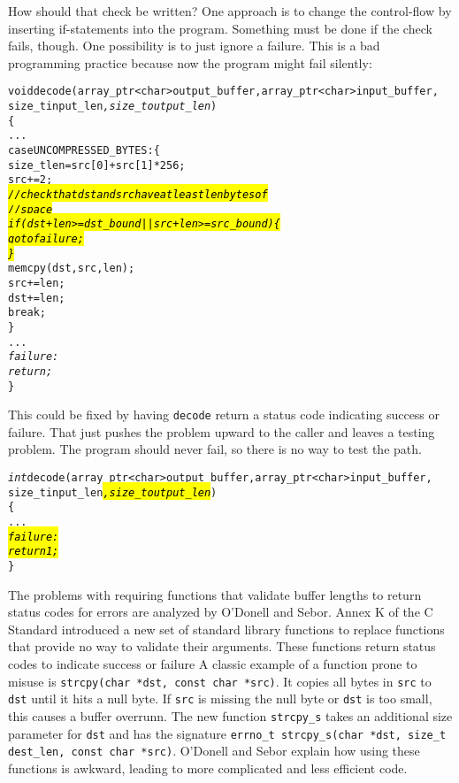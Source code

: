 How should that check be written? One approach is to change the
control-flow by inserting if-statements into the program. Something must
be done if the check fails, though. One possibility is to just ignore a
failure. This is a bad programming practice because now the program might
fail silently:

\begin{alltt}
void decode(array\_ptr<char> output\_buffer, array\_ptr<char> input\_buffer, 
            size\_t input\_len\textit{, size\_t output\_len})
\{
      ...
            case UNCOMPRESSED\_BYTES: \{
                size\_t len = src[0] + src[1]*256;
                src += 2;
                \hl{\textit{// check that dst and src have at least len bytes of}}
                \hl{\textit{// space}}
                \hl{\textit{if (dst + len >= dst\_bound || src + len >= src\_bound) \{}}
                \hl{\textit{   goto failure;}}
                \hl{\textit{\}}}
                memcpy(dst, src, len);
                src += len;
                dst += len;                
                break;
            \}
   ...
   \textit{failure:}
   \textit{   return;}
\}
\end{alltt}

This could be fixed by having \texttt{decode} return a status code
indicating success or failure. That just pushes the problem upward to
the caller and leaves a testing problem. The program should never fail,
so there is no way to test the path.

\begin{alltt}
\textit{int} decode(array\_ptr<char> output\_buffer, array\_ptr<char> input\_buffer, 
            size\_t input\_len\hl{\textit{, size\_t output\_len}})
\{
   ...
\hl{\textit{   failure:}}
\hl{\textit{      return 1;}}
\}
\end{alltt}

The problems with requiring functions that validate buffer lengths to
return status codes for errors are analyzed by O'Donell and Sebor\cite{ODonell2015}. 
Annex K of the C Standard \cite{ISO2011} introduced a new set of standard library functions to replace
functions that provide no way to validate their arguments. These
functions return status codes to indicate success or failure A classic
example of a function prone to misuse is \texttt{strcpy(char *dst, const
char *src)}. It copies all bytes in \texttt{src} to \texttt{dst} until
it hits a null byte. If \texttt{src} is missing the null byte or
\texttt{dst} is too small, this causes a buffer overrunn. The new
function \texttt{strcpy\_s} takes an additional size parameter for
\texttt{dst} and has the signature \texttt{errno\_t strcpy\_s(char *dst,
size\_t dest\_len, const char *src)}. O'Donell and Sebor explain how
using these functions is awkward, leading to more complicated and less
efficient code.

